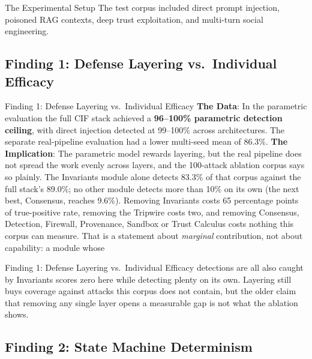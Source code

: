 \documentclass[
  ignorenonframetext,
]{beamer}
\begin{document}
\begin{frame}[allowframebreaks]{The Experimental Setup}
The test corpus included direct prompt injection, poisoned RAG contexts,
deep trust exploitation, and multi-turn social engineering.
\end{frame}

\subsection{Finding 1: Defense Layering vs.~Individual
Efficacy}\label{finding-1-defense-layering-vs.-individual-efficacy}

\begin{frame}[allowframebreaks]{Finding 1: Defense Layering
vs.~Individual Efficacy}
\textbf{The Data}: In the parametric evaluation the full CIF stack
achieved a \textbf{96--100\% parametric detection ceiling}, with direct
injection detected at 99--100\% across architectures. The separate
real-pipeline evaluation had a lower multi-seed mean of 86.3\%.
\textbf{The Implication}: The parametric model rewards layering, but the
real pipeline does not spread the work evenly across layers, and the
100-attack ablation corpus says so plainly. The Invariants module alone
detects 83.3\% of that corpus against the full stack's 89.0\%; no other
module detects more than 10\% on its own (the next best, Consensus,
reaches 9.6\%). Removing Invariants costs 65 percentage points of
true-positive rate, removing the Tripwire costs two, and removing
Consensus, Detection, Firewall, Provenance, Sandbox or Trust Calculus
costs nothing this corpus can measure. That is a statement about
\emph{marginal} contribution, not about capability: a module whose
\end{frame}

\begin{frame}[allowframebreaks]{Finding 1: Defense Layering
vs.~Individual Efficacy}
detections are all also caught by Invariants scores zero here while
detecting plenty on its own. Layering still buys coverage against
attacks this corpus does not contain, but the older claim that removing
any single layer opens a measurable gap is not what the ablation shows.
\end{frame}

\subsection{Finding 2: State Machine
Determinism}\label{finding-2-state-machine-determinism}
\end{document}
